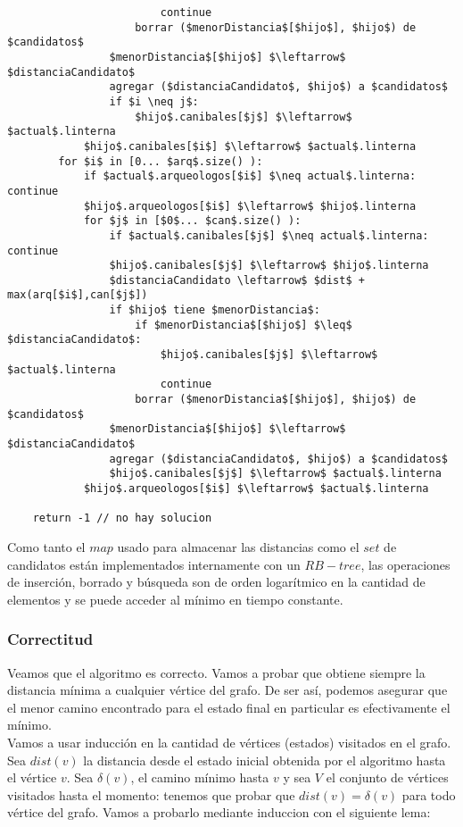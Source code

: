 \begin{lstlisting}
                        continue
                    borrar ($menorDistancia$[$hijo$], $hijo$) de $candidatos$
                $menorDistancia$[$hijo$] $\leftarrow$ $distanciaCandidato$
                agregar ($distanciaCandidato$, $hijo$) a $candidatos$
                if $i \neq j$:
                    $hijo$.canibales[$j$] $\leftarrow$ $actual$.linterna
            $hijo$.canibales[$i$] $\leftarrow$ $actual$.linterna
        for $i$ in [0... $arq$.size() ):
            if $actual$.arqueologos[$i$] $\neq actual$.linterna: continue
            $hijo$.arqueologos[$i$] $\leftarrow$ $hijo$.linterna
            for $j$ in [$0$... $can$.size() ):
                if $actual$.canibales[$j$] $\neq actual$.linterna: continue
                $hijo$.canibales[$j$] $\leftarrow$ $hijo$.linterna
                $distanciaCandidato \leftarrow$ $dist$ + max(arq[$i$],can[$j$])
                if $hijo$ tiene $menorDistancia$:
                    if $menorDistancia$[$hijo$] $\leq$ $distanciaCandidato$:
                        $hijo$.canibales[$j$] $\leftarrow$ $actual$.linterna
                        continue
                    borrar ($menorDistancia$[$hijo$], $hijo$) de $candidatos$
                $menorDistancia$[$hijo$] $\leftarrow$ $distanciaCandidato$
                agregar ($distanciaCandidato$, $hijo$) a $candidatos$
                $hijo$.canibales[$j$] $\leftarrow$ $actual$.linterna
            $hijo$.arqueologos[$i$] $\leftarrow$ $actual$.linterna

    return -1 // no hay solucion

\end{lstlisting}

Como tanto el $map$ usado para almacenar las distancias como el $set$ de candidatos están implementados internamente con un $RB-tree$, las operaciones de inserción, borrado y búsqueda son de orden logarítmico en la cantidad de elementos y se puede acceder al mínimo en tiempo constante.

    \subsubsection{Correctitud}

Veamos que el algoritmo es correcto. Vamos a probar que obtiene siempre la distancia mínima a cualquier vértice del grafo. De ser así, podemos asegurar que el menor camino encontrado para el estado final en particular es efectivamente el mínimo.
\\

Vamos a usar inducción en la cantidad de vértices (estados) visitados en el grafo.
Sea $dist(v)$ la distancia desde el estado inicial obtenida por el algoritmo hasta el vértice $v$. Sea $\delta(v)$, el camino mínimo hasta $v$ y sea $V$ el conjunto de vértices visitados hasta el momento: tenemos que probar que $dist(v) = \delta(v)$ para todo vértice del grafo. Vamos a probarlo mediante induccion con el siguiente lema:
\\

